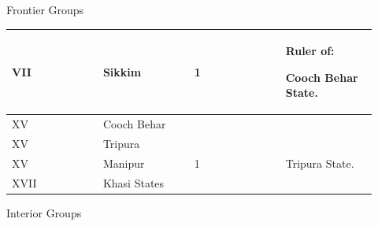 \medskip


\begin{center}
Frontier Groups	\end{center}


\par\medskip
\begin{longtable}{|p{0.23\linewidth}|p{0.23\linewidth}|p{0.23\linewidth}|p{0.23\linewidth}|}
\hline
VII

 & Sikkim

 & \multirow{2}{*}{

1

} & \multirow{2}{*}{

Ruler of:\textemdash{}

Cooch Behar State.

} \\
\hline
XV

 & Cooch Behar

 \\
\hline
XV

 & Tripura

 & \multirow{3}{*}{



1

} & \multirow{3}{*}{



Tripura State.

} \\
\hline
XV

 & Manipur

 \\
\hline
XVII

 & Khasi States

 \\
\hline
\end{longtable}
\medskip
\begin{center}
\end{center}
\begin{center}
Interior Groups\end{center}


